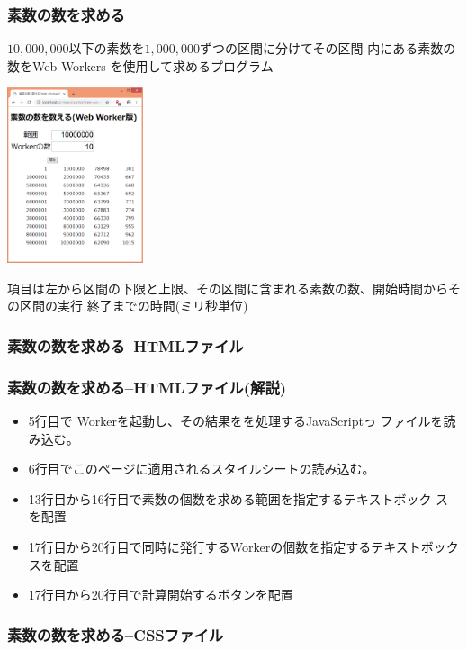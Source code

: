 \begin{frame}[containsverbatim]
 \frametitle{素数の数を求める}
 $10,000,000$以下の素数を$1,000,000$ずつの区間に分けてその区間
 内にある素数の数をWeb Workers を使用して求めるプログラム

 \hspace*{\fill}\includegraphics[width=0.3\textwidth]{../primes/countPrimes-workers-res.eps} \hspace*{\fill}
 
項目は左から区間の下限と上限、その区間に含まれる素数の数、開始時間からその区間の実行
 終了までの時間(ミリ秒単位)
\end{frame}
\begin{frame}[containsverbatim]
 \frametitle{素数の数を求める--HTMLファイル}
\end{frame}
\begin{frame}[containsverbatim]
 \frametitle{素数の数を求める--HTMLファイル(解説)}
 \begin{itemize}
  \item 5行目で Workerを起動し、その結果をを処理するJavaScriptっ
        ファイルを読み込む。
  \item 6行目でこのページに適用されるスタイルシートの読み込む。
  \item 13行目から16行目で素数の個数を求める範囲を指定するテキストボック
        スを配置
   \item 17行目から20行目で同時に発行するWorkerの個数を指定するテキストボック
        スを配置
  \item 17行目から20行目で計算開始するボタンを配置
 \end{itemize}
\end{frame}
\begin{frame}[containsverbatim]
 \frametitle{素数の数を求める--CSSファイル}
\end{frame}
